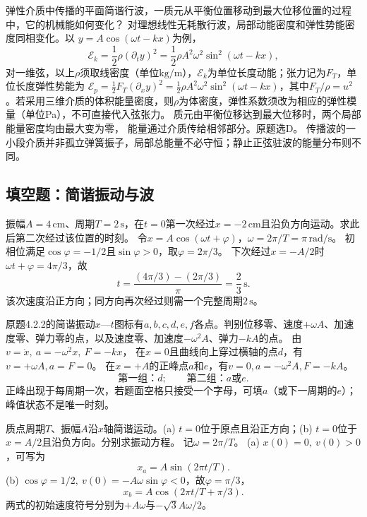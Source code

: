 \problemtext 弹性介质中传播的平面简谐行波，一质元从平衡位置移动到最大位移位置的过程中，它的机械能如何变化？
\workings
对理想线性无耗散行波，局部动能密度和弹性势能密度同相变化。以
$y=A\cos(\omega t-kx)$为例，
\[
\mathcal E_k=\frac12\rho(\partial_t y)^2
=\frac12\rho A^2\omega^2\sin^2(\omega t-kx),
\]
对一维弦，以上$\rho$须取线密度（单位$\mathrm{kg/m}$），$\mathcal E_k$为单位长度动能；张力记为$F_T$，单位长度弹性势能为
$\mathcal E_p=\frac12F_T(\partial_x y)^2
=\frac12\rho A^2\omega^2\sin^2(\omega t-kx)$，其中$F_T/\rho=u^2$。若采用三维介质的体积能量密度，则$\rho$为体密度，弹性系数须改为相应的弹性模量（单位Pa），不可直接代入弦张力。
质元由平衡位移达到最大位移时，两个局部能量密度均由最大变为零，
能量通过介质传给相邻部分。原题选D。
\crosscheck 传播波的一小段介质并非孤立弹簧振子，局部总能量不必守恒；静止正弦驻波的能量分布则不同。

\subsection{填空题：简谐振动与波}

\problemtext 振幅$A=4\,\mathrm{cm}$、周期$T=2\,\mathrm s$，在$t=0$第一次经过$x=-2\,\mathrm{cm}$且沿负方向运动。求此后第二次经过该位置的时刻。
\workings
令$x=A\cos(\omega t+\varphi)$，$\omega=2\pi/T=\pi\,\mathrm{rad/s}$。
初相位满足$\cos\varphi=-1/2$且$\sin\varphi>0$，取$\varphi=2\pi/3$。
下次经过$x=-A/2$时$\omega t+\varphi=4\pi/3$，故
\[
\boxed{t=\frac{(4\pi/3)-(2\pi/3)}{\pi}=\frac23\,\mathrm s}.
\]
\crosscheck 该次速度沿正方向；同方向再次经过则需一个完整周期$2\,\mathrm s$。

\problemtext 原题4.2.2的简谐振动$x$—$t$图标有$a,b,c,d,e,f$各点。判别位移零、速度$+\omega A$、加速度零、弹力零的点，以及速度零、加速度$-\omega^2A$、弹力$-kA$的点。
\workings
由
$v=\dot x,\ a=-\omega^2x,\ F=-kx$，
在$x=0$且曲线向上穿过横轴的点$d$，有$v=+\omega A,a=F=0$。
在$x=+A$的正峰点$a$和$e$，有$v=0,a=-\omega^2A,F=-kA$。
\[
\boxed{\text{第一组：}d;\qquad\text{第二组：}a\text{或}e}.
\]
\crosscheck 正峰出现于每周期一次，若题面空格只接受一个字母，可填$a$（或下一周期的$e$）；峰值状态不是唯一时刻。

\problemtext 质点周期$T$、振幅$A$沿$x$轴简谐运动。(a) $t=0$位于原点且沿正方向；(b) $t=0$位于$x=A/2$且沿负方向。分别求振动方程。
\workings
记$\omega=2\pi/T$。
(a) $x(0)=0,\ v(0)>0$，可写为
\[
\boxed{x_a=A\sin(2\pi t/T)}.
\]
(b) $\cos\varphi=1/2,\ v(0)=-A\omega\sin\varphi<0$，故$\varphi=\pi/3$，
\[
\boxed{x_b=A\cos(2\pi t/T+\pi/3)}.
\]
\crosscheck 两式的初始速度符号分别为$+A\omega$与$-\sqrt3 A\omega/2$。

